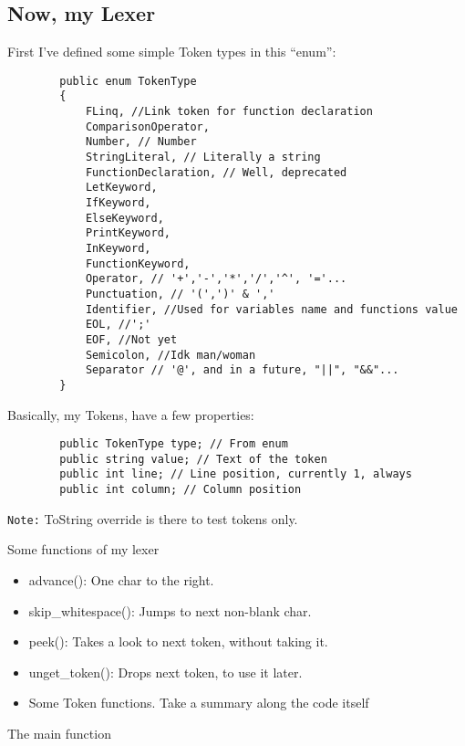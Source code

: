 \subsection{Now, my Lexer}
    First I've defined some simple Token types in this ``enum'':
    \begin{lstlisting}
        public enum TokenType
        {
            FLinq, //Link token for function declaration
            ComparisonOperator,
            Number, // Number
            StringLiteral, // Literally a string
            FunctionDeclaration, // Well, deprecated
            LetKeyword, 
            IfKeyword, 
            ElseKeyword, 
            PrintKeyword, 
            InKeyword,
            FunctionKeyword,
            Operator, // '+','-','*','/','^', '='...
            Punctuation, // '(',')' & ','
            Identifier, //Used for variables name and functions value
            EOL, //';'
            EOF, //Not yet
            Semicolon, //Idk man/woman
            Separator // '@', and in a future, "||", "&&"...
        }
    \end{lstlisting}
    Basically, my Tokens, have a few properties:
    \begin{lstlisting}
        public TokenType type; // From enum
        public string value; // Text of the token
        public int line; // Line position, currently 1, always
        public int column; // Column position
    \end{lstlisting}
    \texttt{Note:} ToString override is there to test tokens only.

    \newpage
    \begin{center}
        \centering
        Some functions of my lexer
    \end{center}
\begin{itemize}
    \item advance{()}: One char to the right.
    \item skip\_whitespace{()}: Jumps to next non-blank char.
    \item peek{()}: Takes a look to next token, without taking it.
    \item unget\_token{()}: Drops next token, to use it later.
    \item Some Token functions. Take a summary along the code itself
\end{itemize}

\begin{center}
    \centering
    The main function
\end{center}

